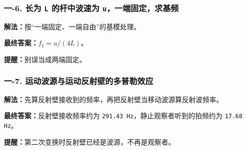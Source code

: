 \documentclass[12pt,a4paper]{ctexart}
\begin{document}
\subsubsection*{一-6. 长为 \texttt{L} 的杆中波速为 \texttt{u}，一端固定，求基频}
\begin{tcolorbox}[colback=gray!2!white,colframe=black!60,title={题目}]

\end{tcolorbox}
\begin{tcolorbox}[colback=blue!2!white,colframe=blue!55!black,title={完整答案}]
\textbf{解法：}按“一端固定、一端自由”的基模处理。\par
\textbf{最终答案：}\(f_1=u/(4L)\)。\par

\end{tcolorbox}
\begin{tcolorbox}[colback=red!2!white,colframe=red!55!black,title={易错点}]
\textbf{提醒：}别误当成两端固定。\par
\end{tcolorbox}

\subsubsection*{一-7. 运动波源与运动反射壁的多普勒效应}
\begin{tcolorbox}[colback=gray!2!white,colframe=black!60,title={题目}]

\end{tcolorbox}
\begin{tcolorbox}[colback=blue!2!white,colframe=blue!55!black,title={完整答案}]
\textbf{解法：}先算反射壁接收到的频率，再把反射壁当移动波源算反射波频率。\par
\textbf{最终答案：}反射壁接收频率约为 \texttt{291.43 Hz}，静止观察者听到的拍频约为 \texttt{17.68 Hz}。\par

\end{tcolorbox}
\begin{tcolorbox}[colback=red!2!white,colframe=red!55!black,title={易错点}]
\textbf{提醒：}第二次变换时反射壁已经是波源，不再是观察者。\par
\end{tcolorbox}
\end{document}
